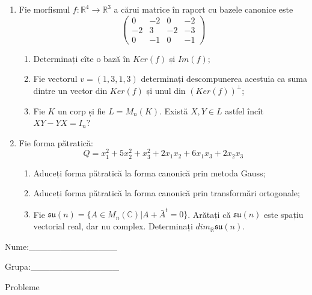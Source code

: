 \documentclass{article}
\begin{document}
\begin{enumerate}
 \item Fie morfismul $f:\mathbb{R}^4 \to \mathbb{R}^3$ a cărui matrice în raport cu bazele canonice este
$$\begin{pmatrix}
0&-2&0&-2\\
-2&3&-2&-3\\
0&-1&0&-1
\end{pmatrix}$$

\begin{enumerate}
\item Determinați cîte o bază în $Ker(f)$ și $Im(f)$;
\item Fie vectorul $v=(1,3,1,3)$ determinați descompunerea acestuia ca suma dintre un vector din $Ker(f)$ și unul din $(Ker(f))^\perp$;
\item Fie $K$ un corp și fie $L=M_n(K)$. Există $X,Y \in L$ astfel încît $XY-YX=I_n$?  
\end{enumerate}
\item Fie forma pătratică:
$$Q= x_1^2+5x_2^2+x_3^2+2x_1x_2+6x_1x_3+2x_2x_3$$

\begin{enumerate}
\item Aduceți forma pătratică la forma canonică prin metoda Gauss;
\item Aduceți forma pătratică la forma canonică prin transformări ortogonale;
\item Fie $\mathfrak{su}(n)=\{ A \in M_n(\mathbb{C}) | A+\bar{A}^t=0\}$. Arătați că $\mathfrak{su}(n)$ este spațiu vectorial real, dar nu complex.
Determinați $dim_{\mathbb{R}}\mathfrak{su}(n)$.
\end{enumerate}
\end{enumerate}
\newpage
\begin{flushright}
Nume:\_\_\_\_\_\_\_\_\_\_\_\_\_\_
 
 
Grupa:\_\_\_\_\_\_\_\_\_\_\_\_\_\_
\end{flushright}
\begin{center}
\vspace{2cm}
{\Large Probleme}
\vspace{2cm}
\end{center}
\end{document}
